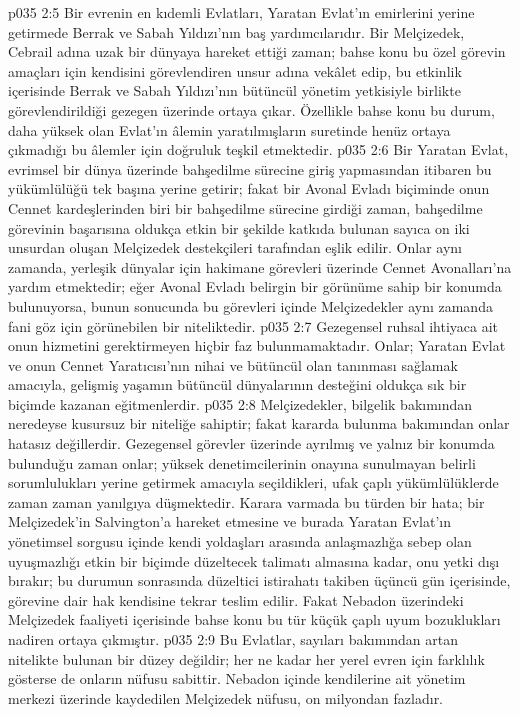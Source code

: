 \vs p035 2:5 Bir evrenin en kıdemli Evlatları, Yaratan Evlat’ın emirlerini yerine getirmede Berrak ve Sabah Yıldızı’nın baş yardımcılarıdır. Bir Melçizedek, Cebrail adına uzak bir dünyaya hareket ettiği zaman; bahse konu bu özel görevin amaçları için kendisini görevlendiren unsur adına vekâlet edip, bu etkinlik içerisinde Berrak ve Sabah Yıldızı’nın bütüncül yönetim yetkisiyle birlikte görevlendirildiği gezegen üzerinde ortaya çıkar. Özellikle bahse konu bu durum, daha yüksek olan Evlat’ın âlemin yaratılmışların suretinde henüz ortaya çıkmadığı bu âlemler için doğruluk teşkil etmektedir.
\vs p035 2:6 Bir Yaratan Evlat, evrimsel bir dünya üzerinde bahşedilme sürecine giriş yapmasından itibaren bu yükümlülüğü tek başına yerine getirir; fakat bir Avonal Evladı biçiminde onun Cennet kardeşlerinden biri bir bahşedilme sürecine girdiği zaman, bahşedilme görevinin başarısına oldukça etkin bir şekilde katkıda bulunan sayıca on iki unsurdan oluşan Melçizedek destekçileri tarafından eşlik edilir. Onlar aynı zamanda, yerleşik dünyalar için hakimane görevleri üzerinde Cennet Avonalları’na yardım etmektedir; eğer Avonal Evladı belirgin bir görünüme sahip bir konumda bulunuyorsa, bunun sonucunda bu görevleri içinde Melçizedekler aynı zamanda fani göz için görünebilen bir niteliktedir.
\vs p035 2:7 Gezegensel ruhsal ihtiyaca ait onun hizmetini gerektirmeyen hiçbir faz bulunmamaktadır. Onlar; Yaratan Evlat ve onun Cennet Yaratıcısı’nın nihai ve bütüncül olan tanınması sağlamak amacıyla, gelişmiş yaşamın bütüncül dünyalarının desteğini oldukça sık bir biçimde kazanan eğitmenlerdir.
\vs p035 2:8 Melçizedekler, bilgelik bakımından neredeyse kusursuz bir niteliğe sahiptir; fakat kararda bulunma bakımından onlar hatasız değillerdir. Gezegensel görevler üzerinde ayrılmış ve yalnız bir konumda bulunduğu zaman onlar; yüksek denetimcilerinin onayına sunulmayan belirli sorumlulukları yerine getirmek amacıyla seçildikleri, ufak çaplı yükümlülüklerde zaman zaman yanılgıya düşmektedir. Karara varmada bu türden bir hata; bir Melçizedek’in Salvington’a hareket etmesine ve burada Yaratan Evlat’ın yönetimsel sorgusu içinde kendi yoldaşları arasında anlaşmazlığa sebep olan uyuşmazlığı etkin bir biçimde düzeltecek talimatı almasına kadar, onu yetki dışı bırakır; bu durumun sonrasında düzeltici istirahatı takiben üçüncü gün içerisinde, görevine dair hak kendisine tekrar teslim edilir. Fakat Nebadon üzerindeki Melçizedek faaliyeti içerisinde bahse konu bu tür küçük çaplı uyum bozuklukları nadiren ortaya çıkmıştır.
\vs p035 2:9 Bu Evlatlar, sayıları bakımından artan nitelikte bulunan bir düzey değildir; her ne kadar her yerel evren için farklılık gösterse de onların nüfusu sabittir. Nebadon içinde kendilerine ait yönetim merkezi üzerinde kaydedilen Melçizedek nüfusu, on milyondan fazladır.

